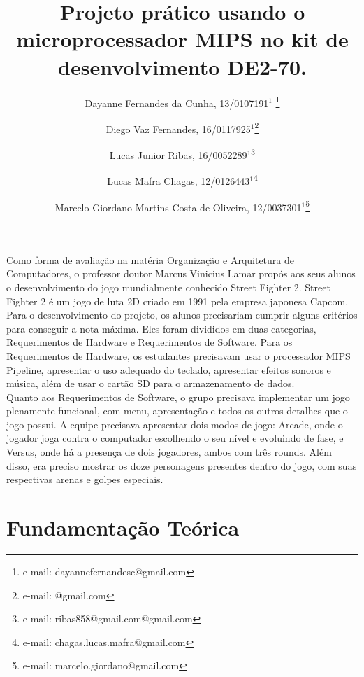 \documentclass{vgtc}                          %
\title{Projeto prático usando o microprocessador MIPS no kit de desenvolvimento DE2-70.}
\author{Dayanne Fernandes da Cunha, 13/0107191$^{1}$ \thanks{e-mail: dayannefernandesc@gmail.com}%
\and Diego Vaz Fernandes, 16/0117925$^{1}$\thanks{e-mail: @gmail.com}%
\and Lucas Junior Ribas, 16/0052289$^{1}$\thanks{e-mail: ribas858@gmail.com@gmail.com}
\and Lucas Mafra Chagas, 12/0126443$^{1}$\thanks{e-mail: chagas.lucas.mafra@gmail.com}
\and Marcelo Giordano Martins Costa de Oliveira, 12/0037301$^{1}$\thanks{e-mail: marcelo.giordano@gmail.com}}
\affiliation{\scriptsize $^{1}$Universidade de Brasília, Departamento de Ciência da Computação, Brasil}
\begin{document}







\maketitle


Como forma de avaliação na matéria Organização e Arquitetura de Computadores, o professor doutor Marcus Vinicius Lamar propós aos seus alunos o desenvolvimento do jogo mundialmente conhecido Street Fighter 2. Street Fighter 2 é um jogo de luta 2D criado em 1991 pela empresa japonesa Capcom.\\ 

Para o desenvolvimento do projeto, os alunos precisariam cumprir alguns critérios para conseguir a nota máxima. Eles foram divididos em duas categorias, Requerimentos de Hardware e Requerimentos de Software. Para os Requerimentos de Hardware, os estudantes precisavam usar o processador MIPS Pipeline, apresentar o uso adequado do teclado, apresentar efeitos sonoros e música, além de usar o cartão SD para o armazenamento de dados. \\

Quanto aos Requerimentos de Software, o grupo precisava implementar um jogo plenamente funcional, com menu, apresentação e todos os outros detalhes que o jogo possui. A equipe precisava apresentar dois modos de jogo: Arcade, onde o jogador joga contra o computador escolhendo o seu nível e evoluindo de fase, e Versus, onde há a presença de dois jogadores, ambos com três rounds. Além disso, era preciso mostrar os doze personagens presentes dentro do jogo, com suas respectivas arenas e golpes especiais. 


\section{Fundamentação Teórica}
\end{document}
